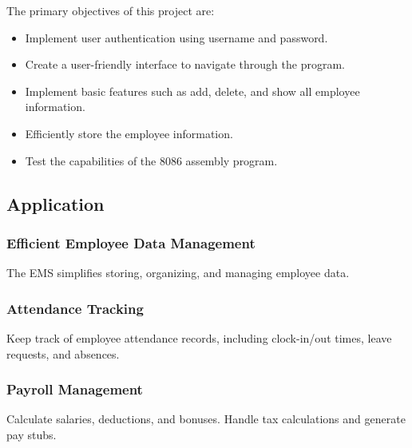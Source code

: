 \documentclass[12pt]{report}
\begin{document}
The primary objectives of this project are:
\begin{itemize}
    \item Implement user authentication using username and password.
    \item Create a user-friendly interface to navigate through the program.
    \item Implement basic features such as add, delete, and show all employee information.
    \item Efficiently store the employee information.
    \item Test the capabilities of the 8086 assembly program.
 
 
 
 
\end{itemize}


\subsection{Application}
\subsubsection{Efficient Employee Data Management}
The EMS simplifies storing, organizing, and managing employee data.
\subsubsection{Attendance Tracking}
Keep track of employee attendance records, including clock-in/out times, leave requests, 
and absences.
\subsubsection{Payroll Management}
Calculate salaries, deductions, and bonuses. Handle tax calculations and generate pay stubs.
\end{document}
